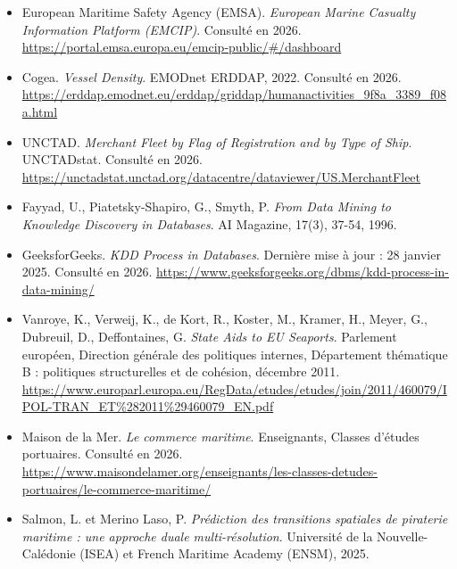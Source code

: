 \documentclass[12pt, a4paper]{report}
\begin{document}
\begin{itemize}
  \item European Maritime Safety Agency (EMSA). \textit{European Marine Casualty Information Platform (EMCIP)}. Consulté en 2026. \url{https://portal.emsa.europa.eu/emcip-public/#/dashboard}
  
  \item Cogea. \textit{Vessel Density}. EMODnet ERDDAP, 2022. Consulté en 2026. \url{https://erddap.emodnet.eu/erddap/griddap/humanactivities_9f8a_3389_f08a.html}
  
  \item UNCTAD. \textit{Merchant Fleet by Flag of Registration and by Type of Ship}. UNCTADstat. Consulté en 2026. \url{https://unctadstat.unctad.org/datacentre/dataviewer/US.MerchantFleet}

  \item Fayyad, U., Piatetsky-Shapiro, G., Smyth, P. \textit{From Data Mining to Knowledge Discovery in Databases}. AI Magazine, 17(3), 37-54, 1996.
  
  \item GeeksforGeeks. \textit{KDD Process in Databases}. Dernière mise à jour : 28 janvier 2025. Consulté en 2026. \url{https://www.geeksforgeeks.org/dbms/kdd-process-in-data-mining/}  
  
  \item Vanroye, K., Verweij, K., de Kort, R., Koster, M., Kramer, H., Meyer, G., Dubreuil, D., Deffontaines, G. \textit{State Aids to EU Seaports}. Parlement européen, Direction générale des politiques internes, Département thématique B : politiques structurelles et de cohésion, décembre 2011. \url{https://www.europarl.europa.eu/RegData/etudes/etudes/join/2011/460079/IPOL-TRAN_ET%282011%29460079_EN.pdf}
  
  \item Maison de la Mer. \textit{Le commerce maritime}. Enseignants, Classes d'études portuaires. Consulté en 2026. \url{https://www.maisondelamer.org/enseignants/les-classes-detudes-portuaires/le-commerce-maritime/}
  
  \item Salmon, L. et Merino Laso, P. \textit{Prédiction des transitions spatiales de piraterie maritime : une approche duale multi-résolution}. Université de la Nouvelle-Calédonie (ISEA) et French Maritime Academy (ENSM), 2025.
\end{itemize}
\end{document}
